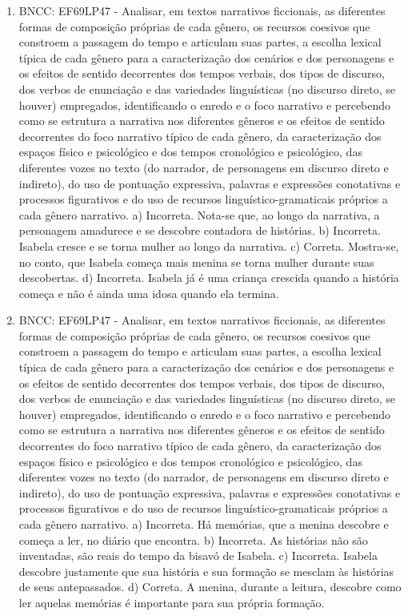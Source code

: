 \begin{enumerate}
\item
BNCC: EF69LP47 - Analisar, em textos narrativos ficcionais, as
diferentes formas de composição próprias de cada gênero, os recursos
coesivos que constroem a passagem do tempo e articulam suas partes, a
escolha lexical típica de cada gênero para a caracterização dos cenários
e dos personagens e os efeitos de sentido decorrentes dos tempos
verbais, dos tipos de discurso, dos verbos de enunciação e das
variedades linguísticas (no discurso direto, se houver) empregados,
identificando o enredo e o foco narrativo e percebendo como se estrutura
a narrativa nos diferentes gêneros e os efeitos de sentido decorrentes
do foco narrativo típico de cada gênero, da caracterização dos espaços
físico e psicológico e dos tempos cronológico e psicológico, das
diferentes vozes no texto (do narrador, de personagens em discurso
direto e indireto), do uso de pontuação expressiva, palavras e
expressões conotativas e processos figurativos e do uso de recursos
linguístico-gramaticais próprios a cada gênero narrativo.
a) Incorreta. Nota-se que, ao longo da narrativa, a personagem amadurece
e se descobre contadora de histórias. b) Incorreta. Isabela cresce e se
torna mulher ao longo da narrativa. c) Correta. Mostra-se, no conto, que
Isabela começa mais menina se torna mulher durante suas descobertas. d)
Incorreta. Isabela já é uma criança crescida quando a história começa e
não é ainda uma idosa quando ela termina.

\item
BNCC: EF69LP47 - Analisar, em textos narrativos ficcionais, as
diferentes formas de composição próprias de cada gênero, os recursos
coesivos que constroem a passagem do tempo e articulam suas partes, a
escolha lexical típica de cada gênero para a caracterização dos cenários
e dos personagens e os efeitos de sentido decorrentes dos tempos
verbais, dos tipos de discurso, dos verbos de enunciação e das
variedades linguísticas (no discurso direto, se houver) empregados,
identificando o enredo e o foco narrativo e percebendo como se estrutura
a narrativa nos diferentes gêneros e os efeitos de sentido decorrentes
do foco narrativo típico de cada gênero, da caracterização dos espaços
físico e psicológico e dos tempos cronológico e psicológico, das
diferentes vozes no texto (do narrador, de personagens em discurso
direto e indireto), do uso de pontuação expressiva, palavras e
expressões conotativas e processos figurativos e do uso de recursos
linguístico-gramaticais próprios a cada gênero narrativo.
a) Incorreta. Há memórias, que a menina descobre e começa a ler, no
diário que encontra. b) Incorreta. As histórias não são inventadas, são
reais do tempo da bisavó de Isabela. c) Incorreta. Isabela descobre
justamente que sua história e sua formação se mesclam às histórias de
seus antepassados. d) Correta. A menina, durante a leitura, descobre
como ler aquelas memórias é importante para sua própria formação.


\end{enumerate}
